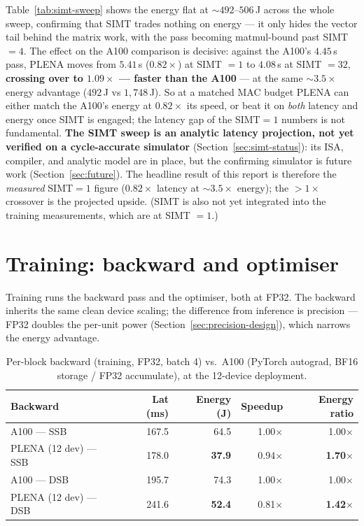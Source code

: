 \documentclass[11pt]{report}
\begin{document}
Table~\ref{tab:simt-sweep} shows the energy flat at ${\sim}492$--$506$\,J
across the whole sweep, confirming that SIMT trades nothing on energy ---
it only hides the vector tail behind the matrix work, with the pass becoming
matmul-bound past SIMT $=4$. The effect on the A100 comparison is decisive:
against the A100's $4.45$\,s pass, PLENA moves from $5.41$\,s ($0.82\times$)
at SIMT $=1$ to $4.08$\,s at SIMT $=32$, \textbf{crossing over to
$1.09\times$ --- faster than the A100} --- at the same ${\sim}3.5\times$
energy advantage ($492$\,J vs $1{,}748$\,J). So at a matched MAC budget PLENA
can either match the A100's energy at $0.82\times$ its speed, or beat it on
\emph{both} latency and energy once SIMT is engaged; the latency gap of the
SIMT$=1$ numbers is not fundamental. \textbf{The SIMT sweep is an analytic
latency projection, not yet verified on a cycle-accurate simulator}
(Section~\ref{sec:simt-status}): its ISA, compiler, and analytic model are in
place, but the confirming simulator is future work
(Section~\ref{sec:future}). The headline result of this report is therefore
the \emph{measured} SIMT$=1$ figure ($0.82\times$ latency at ${\sim}3.5\times$
energy); the $>$$1\times$ crossover is the projected upside. (SIMT is also not
yet integrated into the training measurements, which are at SIMT $=1$.)

\section{Training: backward and optimiser}
\label{sec:results-training}

Training runs the backward pass and the optimiser, both at FP32. The
backward inherits the same clean device scaling; the difference from
inference is precision --- FP32 doubles the per-unit power
(Section~\ref{sec:precision-design}), which narrows the energy advantage.

\begin{table}[h]
\centering
\caption{Per-block backward (training, FP32, batch 4) vs.\ A100 (PyTorch
autograd, BF16 storage / FP32 accumulate), at the 12-device deployment.}
\label{tab:bwd-vs-a100}
\begin{tabular}{@{}lrrrr@{}}
\toprule
Backward & Lat (ms) & Energy (J) & Speedup & Energy ratio \\
\midrule
A100 --- SSB & 167.5 & 64.5 & 1.00$\times$ & 1.00$\times$ \\
PLENA (12 dev) --- SSB & 178.0 & \textbf{37.9} & 0.94$\times$ & \textbf{1.70$\times$} \\
A100 --- DSB & 195.7 & 74.3 & 1.00$\times$ & 1.00$\times$ \\
PLENA (12 dev) --- DSB & 241.6 & \textbf{52.4} & 0.81$\times$ & \textbf{1.42$\times$} \\
\bottomrule
\end{tabular}
\end{table}
\end{document}
